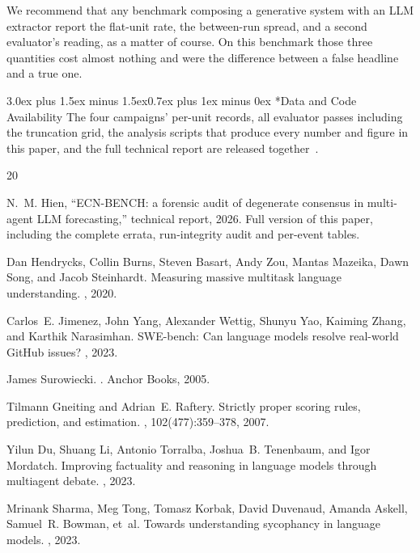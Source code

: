 \documentclass[10pt,conference]{IEEEtran}
\makeatletter
\renewcommand\section{\@startsection{section}{1}{\z@}%
  {3.0ex plus 1.5ex minus 1.5ex}{0.7ex plus 1ex minus 0ex}%
  {\normalfont\normalsize\centering\bfseries}}
\makeatother
\begin{document}
We recommend that any benchmark composing a generative system with an LLM extractor report the flat-unit rate, the between-run spread, and a second evaluator's reading, as a matter of course. On this benchmark those three quantities cost almost nothing and were the difference between a false headline and a true one.

\section*{Data and Code Availability}
The four campaigns' per-unit records, all evaluator passes including the truncation grid, the analysis scripts that produce every number and figure in this paper, and the full technical report are released together~\cite{techreport}.


\begin{thebibliography}{20}

N.~M. Hien, ``ECN-BENCH: a forensic audit of degenerate consensus in multi-agent LLM forecasting,'' technical report, 2026. Full version of this paper, including the complete errata, run-integrity audit and per-event tables.

Dan Hendrycks, Collin Burns, Steven Basart, Andy Zou, Mantas Mazeika, Dawn Song, and Jacob Steinhardt.
\newblock Measuring massive multitask language understanding.
, 2020.

Carlos~E. Jimenez, John Yang, Alexander Wettig, Shunyu Yao, Kaiming Zhang, and Karthik Narasimhan.
\newblock SWE-bench: Can language models resolve real-world GitHub issues?
, 2023.

James Surowiecki.
.
\newblock Anchor Books, 2005.

Tilmann Gneiting and Adrian~E. Raftery.
\newblock Strictly proper scoring rules, prediction, and estimation.
, 102(477):359--378, 2007.

Yilun Du, Shuang Li, Antonio Torralba, Joshua~B. Tenenbaum, and Igor Mordatch.
\newblock Improving factuality and reasoning in language models through multiagent debate.
, 2023.

Mrinank Sharma, Meg Tong, Tomasz Korbak, David Duvenaud, Amanda Askell, Samuel~R. Bowman, et~al.
\newblock Towards understanding sycophancy in language models.
, 2023.


\end{thebibliography}
\end{document}
